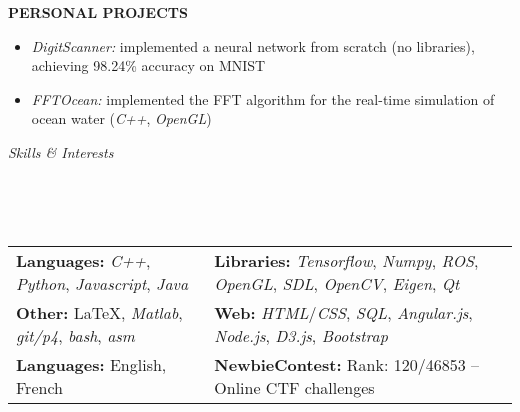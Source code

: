 \documentclass[a4paper, 12pt]{article}
\newcommand{\marginline}{-0.3cm}
\newcommand{\margincontent}{-0.6cm}
\newcommand{\marginbeforesection}{0.35cm}
\newcommand{\marginbeforemisc}{-0.75cm}
\newcommand{\linewidthperso}{0.02cm}
\newcommand{\styletitle}[1]{\textbf{#1}}
\newcommand{\stylesection}[1]{
  \vspace{\marginbeforesection}
  \begin{normalsize}\textit{#1}\end{normalsize}
  \vspace{\marginline}\\
  \noindent\makebox[\linewidth]{\rule{\textwidth}{\linewidthperso}}

}
\begin{document}
\begin{footnotesize}
\styletitle{PERSONAL PROJECTS}\\
\vspace{\margincontent}
\begin{itemize}
  \item \textit{DigitScanner:} implemented a neural network from scratch (no libraries), achieving 98.24\% accuracy on MNIST
  \item \textit{FFTOcean:} implemented the FFT algorithm for the real-time simulation of ocean water (\textit{C++}, \textit{OpenGL})
\end{itemize}

\stylesection{Skills \& Interests}
~\\
\vspace{\marginbeforemisc}

\noindent\begin{tabular}{@{}p{7.15cm}p{12cm}}
  \textbf{Languages:} \textit{C++}, \textit{Python}, \textit{Javascript}, \textit{Java} & \textbf{Libraries:} \textit{Tensorflow}, \textit{Numpy}, \textit{ROS}, \textit{OpenGL}, \textit{SDL}, \textit{OpenCV}, \textit{Eigen}, \textit{Qt}\\
  \textbf{Other:} \LaTeX, \textit{Matlab}, \textit{git/p4}, \textit{bash}, \textit{asm} & \textbf{Web:} \textit{HTML}/\textit{CSS}, \textit{SQL}, \textit{Angular.js}, \textit{Node.js}, \textit{D3.js}, \textit{Bootstrap}\\
  \textbf{Languages:} English, French & \textbf{NewbieContest:} Rank: 120/46853 -- Online CTF challenges\\
\end{tabular}

\end{footnotesize}
\end{document}
